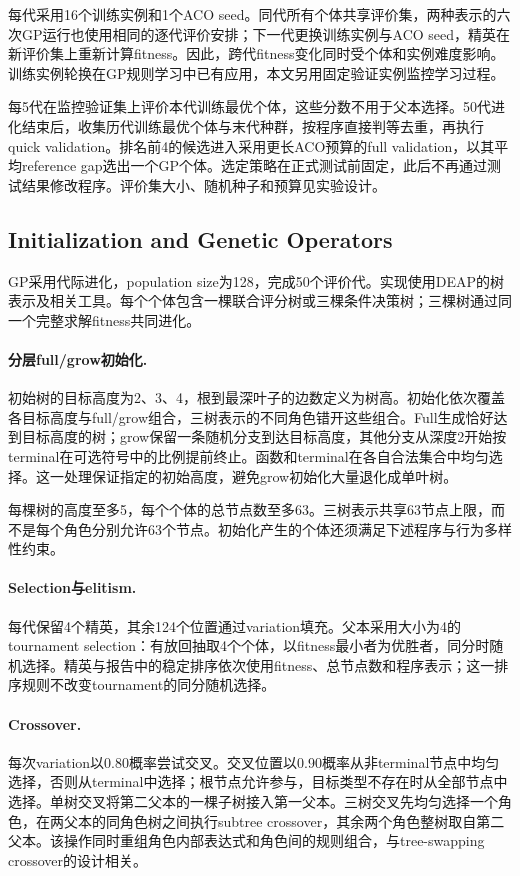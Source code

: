 每代采用16个训练实例和1个ACO seed。同代所有个体共享评价集，两种表示的六次GP运行也使用相同的逐代评价安排；下一代更换训练实例与ACO seed，精英在新评价集上重新计算fitness。因此，跨代fitness变化同时受个体和实例难度影响。训练实例轮换在GP规则学习中已有应用\cite{mei2018orienteering,maclachlan2020}，本文另用固定验证实例监控学习过程。

每5代在监控验证集上评价本代训练最优个体，这些分数不用于父本选择。50代进化结束后，收集历代训练最优个体与末代种群，按程序直接判等去重，再执行quick validation。排名前4的候选进入采用更长ACO预算的full validation，以其平均reference gap选出一个GP个体。选定策略在正式测试前固定，此后不再通过测试结果修改程序。评价集大小、随机种子和预算见实验设计。

\subsection{Initialization and Genetic Operators}
\label{sec:evolution}
GP采用代际进化，population size为128，完成50个评价代。实现使用DEAP的树表示及相关工具\cite{fortin2012}。每个个体包含一棵联合评分树或三棵条件决策树；三棵树通过同一个完整求解fitness共同进化。

\paragraph{分层full/grow初始化.}
初始树的目标高度为2、3、4，根到最深叶子的边数定义为树高。初始化依次覆盖各目标高度与full/grow组合，三树表示的不同角色错开这些组合。Full生成恰好达到目标高度的树；grow保留一条随机分支到达目标高度，其他分支从深度2开始按terminal在可选符号中的比例提前终止。函数和terminal在各自合法集合中均匀选择。这一处理保证指定的初始高度，避免grow初始化大量退化成单叶树。

每棵树的高度至多5，每个个体的总节点数至多63。三树表示共享63节点上限，而不是每个角色分别允许63个节点。初始化产生的个体还须满足下述程序与行为多样性约束。

\paragraph{Selection与elitism.}
每代保留4个精英，其余124个位置通过variation填充。父本采用大小为4的tournament selection：有放回抽取4个个体，以fitness最小者为优胜者，同分时随机选择。精英与报告中的稳定排序依次使用fitness、总节点数和程序表示；这一排序规则不改变tournament的同分随机选择。

\paragraph{Crossover.}
每次variation以0.80概率尝试交叉。交叉位置以0.90概率从非terminal节点中均匀选择，否则从terminal中选择；根节点允许参与，目标类型不存在时从全部节点中选择。单树交叉将第二父本的一棵子树接入第一父本。三树交叉先均匀选择一个角色，在两父本的同角色树之间执行subtree crossover，其余两个角色整树取自第二父本。该操作同时重组角色内部表达式和角色间的规则组合，与tree-swapping crossover的设计相关\cite{zhang2018multitree}。

